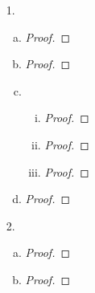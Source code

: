 
\begin{itemize}

\item[1.] 
\begin{enumerate}[(a)]
\item 
\begin{proof}

\end{proof}


\item 
\begin{proof}

\end{proof}


\item 
    \begin{enumerate}[(i)]
        \item 
        \begin{proof}
        
        \end{proof}
        
        \item 
        \begin{proof}

        \end{proof}
        \item 
        \begin{proof}

        \end{proof}
    \end{enumerate}


\item 
\begin{proof}

\end{proof}
\end{enumerate}











\item[2.] 
\begin{enumerate}[(a)]
\item 
\begin{proof}
        
\end{proof}


\item 
\begin{proof}


\end{proof}
\end{enumerate}
\end{itemize}
